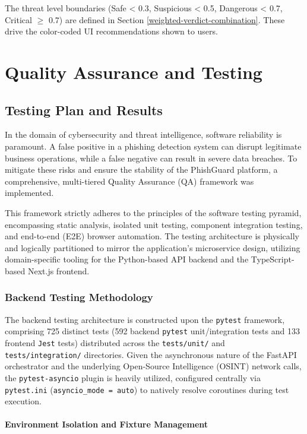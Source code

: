The threat level boundaries (Safe < 0.3, Suspicious < 0.5, Dangerous < 0.7, Critical $\geq$ 0.7) are defined in Section \ref{weighted-verdict-combination}. These drive the color-coded UI recommendations shown to users.

\section{Quality Assurance and Testing}

\subsection{Testing Plan and Results}

In the domain of cybersecurity and threat intelligence, software
reliability is paramount. A false positive in a phishing detection
system can disrupt legitimate business operations, while a false
negative can result in severe data breaches. To mitigate these risks and
ensure the stability of the PhishGuard platform, a comprehensive,
multi-tiered Quality Assurance (QA) framework was implemented.

This framework strictly adheres to the principles of the software
testing pyramid, encompassing static analysis, isolated unit testing,
component integration testing, and end-to-end (E2E) browser automation.
The testing architecture is physically and logically partitioned to
mirror the application's microservice design, utilizing domain-specific
tooling for the Python-based API backend and the TypeScript-based
Next.js frontend.

\subsubsection{Backend Testing
Methodology}\label{backend-testing-methodology}

The backend testing architecture is constructed upon the \texttt{pytest}
framework, comprising 725 distinct tests (592 backend \texttt{pytest} unit/integration tests and 133 frontend \texttt{Jest} tests) distributed
across the \texttt{tests/unit/} and \texttt{tests/integration/}
directories. Given the asynchronous nature of the FastAPI orchestrator
and the underlying Open-Source Intelligence (OSINT) network calls, the
\texttt{pytest-asyncio} plugin is heavily utilized, configured centrally
via \texttt{pytest.ini} (\texttt{asyncio\_mode\ =\ auto}) to natively
resolve coroutines during test execution.

\paragraph{Environment Isolation and Fixture
Management}\label{environment-isolation-and-fixture-management}

